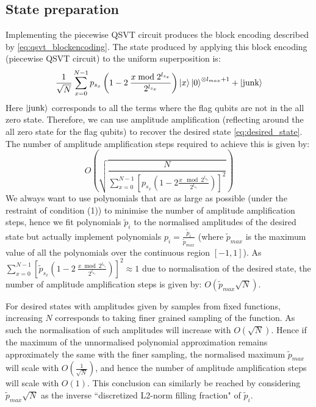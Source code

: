 \documentclass[a4paper,twocolumn,,accepted=2025-05-27]{quantumarticle}
\theoremstyle{empty}
\begin{document}
\subsection{State preparation}
\label{section:state_prep}
Implementing the piecewise QSVT circuit produces the block encoding described by \eqref{eq:qsvt_blockencoding}. The state produced by applying this block encoding (piecewise QSVT circuit) to the uniform superposition is: 
\begin{equation}
    \frac{1}{\sqrt{N}}\sum_{x=0}^{N-1} p_{s_x}\left( 1 - 2\>\frac{x \bmod 2^{l_{s_x}}}{2^{l_{s_x}}}\right)  \ket{x}\ket{0}^{\otimes l_{max}+1} + \ket{\text{junk}}
\end{equation}
Here $\ket{\text{junk}}$ corresponds to all the terms where the flag qubits are not in the all zero state. Therefore, we can use amplitude amplification (reflecting around the all zero state for the flag qubits) to recover the desired state \eqref{eq:desired_state}. The number of amplitude amplification steps required to achieve this is given by:
\begin{equation}
    O\left(\sqrt{\frac{N}{\sum_{x=0}^{N-1} \left[p_{s_x}\left( 1 - 2\frac{x \mod 2^{l_{s_x}}}{2^{l_{s_x}}}\right)\right]^2}}\right)
\end{equation}
We always want to use polynomials that are as large as possible (under the restraint of condition (1)) to minimise the number of amplitude amplification steps, hence we fit polynomials $\tilde p_i$ to the normalised amplitudes of the desired state but actually implement polynomials $p_i = \frac{\tilde p_i}{\tilde p_{max}}$ (where $\tilde{p}_{max}$ is the maximum value of all the polynomials over the continuous region $[-1,1]$). As $\sum_{x=0}^{N-1} \left[ \tilde{p}_{s_x}\left( 1 - 2\>\frac{x \bmod 2^{l_{s_x}}}{2^{l_{s_x}}}\right)\right]^2 \approx 1$ due to normalisation of the desired state, the number of amplitude amplification steps is given by: $O(\tilde{p}_{max}\sqrt{N})$. 

For desired states with amplitudes given by samples from fixed functions, increasing $N$ corresponds to taking finer grained sampling of the function. As such the normalisation of such amplitudes will increase with $O(\sqrt{N})$. Hence if the maximum of the unnormalised polynomial approximation remains approximately the same with the finer sampling, the normalised maximum $\tilde{p}_{max}$ will scale with $O(\frac{1}{\sqrt{N}})$, and hence the number of amplitude amplification steps will scale with $O(1)$. This conclusion can similarly be reached by considering $\tilde{p}_{max} \sqrt{N}$ as the inverse ``discretized L2-norm filling fraction" of $\tilde{p}_i$.
\end{document}
